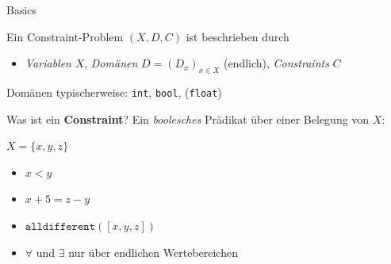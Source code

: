 \documentclass[10pt,xcolor={dvipsnames},fleqn]{beamer}
\begin{document}
\begin{frame}{Basics}
\begin{definition}
Ein \alert{Constraint-Problem} $(X, D, C)$ ist beschrieben durch
\begin{itemize}
  \item \emph{Variablen} $X$,
\emph{Domänen} $D = (D_x)_{x \in X}$ (endlich),
\emph{Constraints} $C$ 
\end{itemize} 

\end{definition}
\pause

Domänen typischerweise: \texttt{int}, \texttt{bool}, (\texttt{float})
\vspace*{2ex}

Was ist ein \textbf{Constraint}? Ein \emph{boolesches} Prädikat über einer Belegung von $X$:

$X = \{x, y, z \}$
\begin{itemize}
\item $x < y$
\item $x + 5 = z - y$
\item $\texttt{alldifferent}([x,y,z])$
\item $\forall$ und $\exists$ nur über endlichen Wertebereichen 
\end{itemize}
\end{frame} 
%
%
%
%
%
\end{document}
